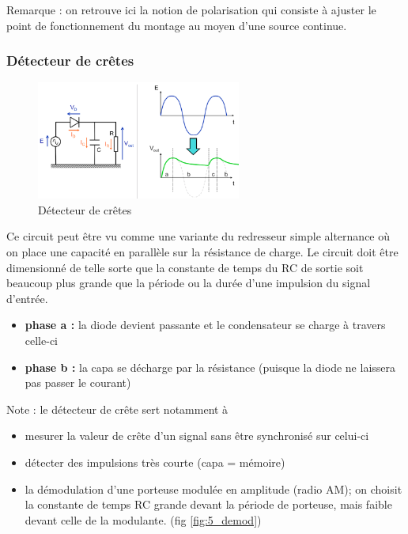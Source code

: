 \documentclass[a4paper]{article}
\begin{document}
    Remarque : on retrouve ici la notion de polarisation qui consiste à ajuster
    le point de fonctionnement du montage au moyen d'une source continue. 

    \subsubsection{Détecteur de crêtes}
    \begin{figure}[H]
        \begin{center}
            \includegraphics[width=0.6\textwidth]{fig/5_detecteurcretes.png}
            \caption{Détecteur de crêtes}
            \label{fig:5_detecteurcretes}
        \end{center}
    \end{figure}
    Ce circuit peut être vu comme une variante du redresseur simple alternance 
    où on place une capacité en parallèle sur la résistance de charge. Le circuit
    doit être dimensionné de telle sorte que la constante de temps du RC de sortie
    soit beaucoup plus grande que la période ou la durée d'une impulsion du signal d'entrée.
    \begin{itemize}
        \item \textbf{phase a :} la diode devient passante et le condensateur
        se charge à travers celle-ci
        \item \textbf{phase b :} la capa se décharge par la résistance (puisque
        la diode ne laissera pas passer le courant)
    \end{itemize}
    Note : le détecteur de crête sert notamment à 
    \begin{itemize}
        \item mesurer la valeur de crête d'un signal sans être synchronisé sur celui-ci
        \item détecter des impulsions très courte (capa = mémoire)
        \item la démodulation d'une porteuse modulée en amplitude (radio AM); on 
        choisit la constante de temps RC grande devant la période de porteuse, mais
        faible devant celle de la modulante. (fig \ref{fig:5_demod})
    \end{itemize}
\end{document}
